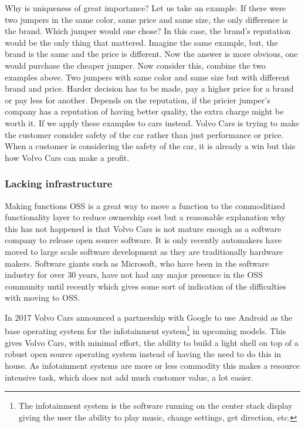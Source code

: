 \documentclass[conference]{IEEEtran}
\begin{document}
Why is uniqueness of great importance? Let us take an example. If there were two jumpers in the same color, same price and same size, the only difference is the brand. Which jumper would one chose? In this case, the brand's reputation would be the only thing that mattered. Imagine the same example, but, the brand is the same and the price is different. Now the answer is more obvious, one would purchase the cheaper jumper. Now consider this, combine the two examples above. Two jumpers with same color and same size but with different brand and price. Harder decision has to be made, pay a higher price for a brand or pay less for another. Depends on the reputation, if the pricier jumper's company has a reputation of having better quality, the extra charge might be worth it. If we apply these examples to cars instead. Volvo Cars is trying to make the customer consider safety of the car rather than just performance or price. When a customer is considering the safety of the car, it is already a win but this how Volvo Cars can make a profit.

\subsubsection{Lacking infrastructure}
Making functions OSS is a great way to move a function to the commoditized functionality layer to reduce ownership cost but a  reasonable explanation why this has not happened is that Volvo Cars is not mature enough as a software company to release open source software. It is only recently automakers have moved to large scale software development as they are traditionally hardware makers. Software giants such as Microsoft, who have been in the software industry for over 30 years, have not had any major presence in the OSS community until recently which gives some sort of indication of the difficulties with moving to OSS. \cite{MicrosoftOSS}

In 2017 Volvo Cars announced a partnership with Google to use Android as the base operating system for the infotainment system\footnote{The infotainment system is the software running on the center stack display giving the user the ability to play music, change settings, get direction, etc.} in upcoming models. \cite{VolvoAndroid} This gives Volvo Cars, with minimal effort, the ability to build a light shell on top of a robust open source operating system instead of having the need to do this in house. As infotainment systems are more or less commodity this makes a resource intensive task, which does not add much customer value, a lot easier.
\end{document}
